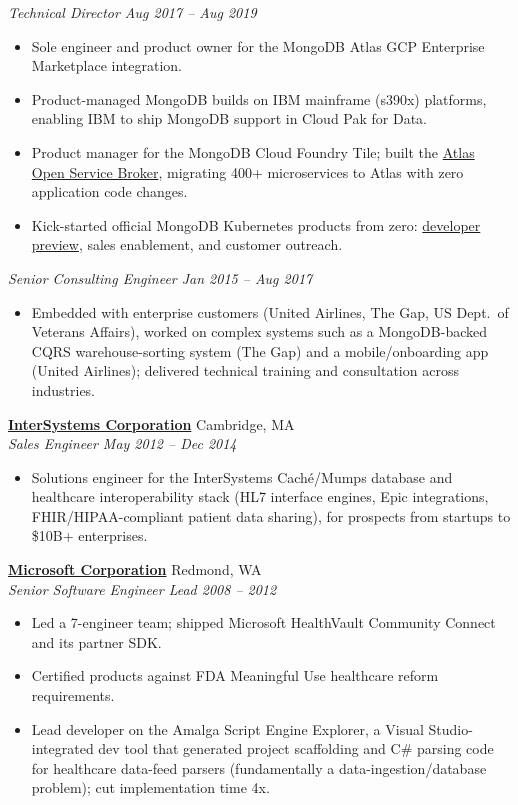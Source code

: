 \documentclass[10pt,letterpaper]{article}
\begin{document}
{\small\itshape\color{accent} Technical Director \hfill Aug 2017 -- Aug 2019}
\begin{itemize}
\item {\small Sole engineer and product owner for the MongoDB Atlas GCP Enterprise Marketplace integration.}
\item {\small Product-managed MongoDB builds on IBM mainframe (s390x) platforms, enabling IBM to ship MongoDB support in Cloud Pak for Data.}
\item {\small Product manager for the MongoDB Cloud Foundry Tile; built the \href{https://github.com/mongodb/atlas-osb}{Atlas Open Service Broker}, migrating 400+ microservices to Atlas with zero application code changes.}
\item {\small Kick-started official MongoDB Kubernetes products from zero: \href{https://cloud.redhat.com/blog/dev-preview-mongodb-enterprise-running-on-openshift}{developer preview}, sales enablement, and customer outreach.}
\end{itemize}

{\small\itshape\color{accent} Senior Consulting Engineer \hfill Jan 2015 -- Aug 2017}
\begin{itemize}
\item {\small Embedded with enterprise customers (United Airlines, The Gap, US Dept.\ of Veterans Affairs), worked on complex systems such as a MongoDB-backed CQRS warehouse-sorting system (The Gap) and a mobile/onboarding app (United Airlines); delivered technical training and consultation across industries.}
\end{itemize}

\textbf{\href{http://www.intersystems.com/}{InterSystems Corporation}} \hfill {\small\color{lighttext} Cambridge, MA}\\
{\small\itshape\color{accent} Sales Engineer \hfill May 2012 -- Dec 2014}
\begin{itemize}
\item {\small Solutions engineer for the InterSystems Cach\'e/Mumps database and healthcare interoperability stack (HL7 interface engines, Epic integrations, FHIR/HIPAA-compliant patient data sharing), for prospects from startups to \$10B+ enterprises.}
\end{itemize}

\textbf{\href{http://www.microsoft.com}{Microsoft Corporation}} \hfill {\small\color{lighttext} Redmond, WA}\\
{\small\itshape\color{accent} Senior Software Engineer Lead \hfill 2008 -- 2012}
\begin{itemize}
\item {\small Led a 7-engineer team; shipped Microsoft HealthVault Community Connect and its partner SDK.}
\item {\small Certified products against FDA Meaningful Use healthcare reform requirements.}
\item {\small Lead developer on the Amalga Script Engine Explorer, a Visual Studio-integrated dev tool that generated project scaffolding and C\# parsing code for healthcare data-feed parsers (fundamentally a data-ingestion/database problem); cut implementation time 4x.}
\end{itemize}
\end{document}
